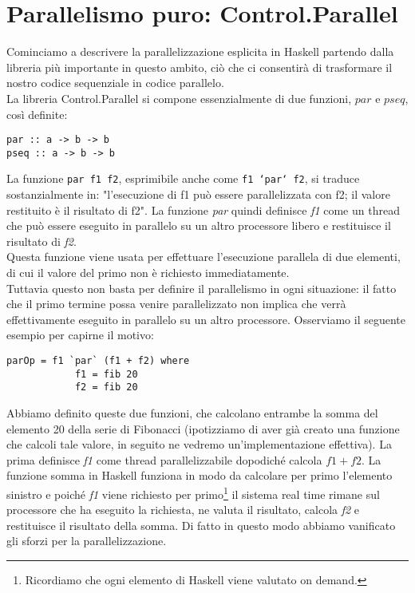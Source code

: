 \section{Parallelismo puro: Control.Parallel}
Cominciamo a descrivere la parallelizzazione esplicita in Haskell partendo dalla libreria più importante in questo ambito, ciò che ci consentirà di trasformare il nostro codice sequenziale in codice parallelo.\\
La libreria Control.Parallel si compone essenzialmente di due funzioni, $par$ e $pseq$, così definite:
\begin{verbatim}
par :: a -> b -> b
pseq :: a -> b -> b
\end{verbatim}
La funzione \texttt{par f1 f2}, esprimibile anche come \texttt{f1 `par` f2}, si traduce sostanzialmente in: "l'esecuzione di f1 può essere parallelizzata con f2; il valore restituito è il risultato di f2". La funzione \textit{par} quindi definisce \textit{f1} come un thread che può essere eseguito in parallelo su un altro processore libero e restituisce il risultato di \textit{f2}.\\
Questa funzione viene usata per effettuare l'esecuzione parallela di due elementi, di cui il valore del primo non è richiesto immediatamente.\\
Tuttavia questo non basta per definire il parallelismo in ogni situazione: il fatto che il primo termine possa venire parallelizzato non implica che verrà effettivamente eseguito in parallelo su un altro processore. Osserviamo il seguente esempio per capirne il motivo:
\begin{verbatim}
parOp = f1 `par` (f1 + f2) where
            f1 = fib 20
            f2 = fib 20
\end{verbatim}
Abbiamo definito queste due funzioni, che calcolano entrambe la somma del elemento 20 della serie di Fibonacci (ipotizziamo di aver già creato una funzione che calcoli tale valore, in seguito ne vedremo un'implementazione effettiva). La prima definisce \textit{f1} come thread parallelizzabile dopodiché calcola $f1 + f2$. La funzione somma in Haskell funziona in modo da calcolare per primo l'elemento sinistro e poiché \textit{f1} viene richiesto per primo\footnote{Ricordiamo che ogni elemento di Haskell viene valutato on demand.} il sistema real time rimane sul processore che ha eseguito la richiesta, ne valuta il risultato, calcola \textit{f2} e restituisce il risultato della somma. Di fatto in questo modo abbiamo vanificato gli sforzi per la parallelizzazione.\\
